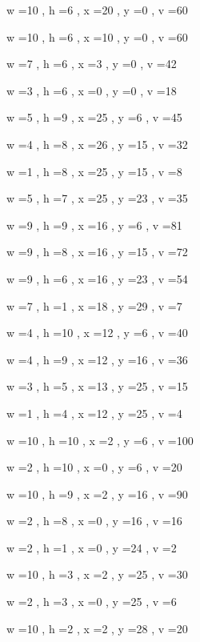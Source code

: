 \documentclass[11pt]{article}
\begin{document}
w =10 , h =6 , x =20 , y =0 , v =60
\par
w =10 , h =6 , x =10 , y =0 , v =60
\par
w =7 , h =6 , x =3 , y =0 , v =42
\par
w =3 , h =6 , x =0 , y =0 , v =18
\par
w =5 , h =9 , x =25 , y =6 , v =45
\par
w =4 , h =8 , x =26 , y =15 , v =32
\par
w =1 , h =8 , x =25 , y =15 , v =8
\par
w =5 , h =7 , x =25 , y =23 , v =35
\par
w =9 , h =9 , x =16 , y =6 , v =81
\par
w =9 , h =8 , x =16 , y =15 , v =72
\par
w =9 , h =6 , x =16 , y =23 , v =54
\par
w =7 , h =1 , x =18 , y =29 , v =7
\par
w =4 , h =10 , x =12 , y =6 , v =40
\par
w =4 , h =9 , x =12 , y =16 , v =36
\par
w =3 , h =5 , x =13 , y =25 , v =15
\par
w =1 , h =4 , x =12 , y =25 , v =4
\par
w =10 , h =10 , x =2 , y =6 , v =100
\par
w =2 , h =10 , x =0 , y =6 , v =20
\par
w =10 , h =9 , x =2 , y =16 , v =90
\par
w =2 , h =8 , x =0 , y =16 , v =16
\par
w =2 , h =1 , x =0 , y =24 , v =2
\par
w =10 , h =3 , x =2 , y =25 , v =30
\par
w =2 , h =3 , x =0 , y =25 , v =6
\par
w =10 , h =2 , x =2 , y =28 , v =20
\par
\newpage


\end{document}

